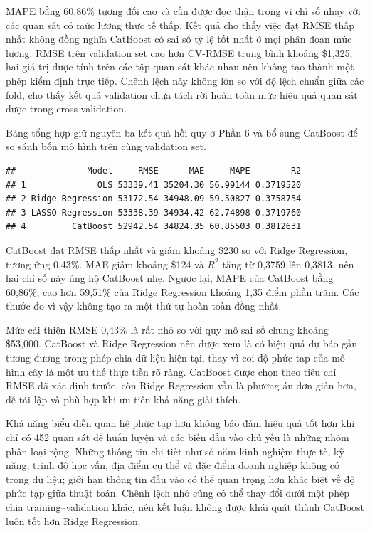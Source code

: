MAPE bằng 60,86\% tương đối cao và cần được đọc thận trọng vì chỉ số
nhạy với các quan sát có mức lương thực tế thấp. Kết quả cho thấy việc
đạt RMSE thấp nhất không đồng nghĩa CatBoost có sai số tỷ lệ tốt nhất ở
mọi phân đoạn mức lương. RMSE trên validation set cao hơn CV-RMSE trung
bình khoảng \$1,325; hai giá trị được tính trên các tập quan sát khác
nhau nên không tạo thành một phép kiểm định trực tiếp. Chênh lệch này
không lớn so với độ lệch chuẩn giữa các fold, cho thấy kết quả
validation chưa tách rời hoàn toàn mức hiệu quả quan sát được trong
cross-validation.

Bảng tổng hợp giữ nguyên ba kết quả hồi quy ở Phần 6 và bổ sung CatBoost
để so sánh bốn mô hình trên cùng validation set.

\begin{verbatim}
##              Model     RMSE      MAE     MAPE        R2
## 1              OLS 53339.41 35204.30 56.99144 0.3719520
## 2 Ridge Regression 53172.54 34948.09 59.50827 0.3758754
## 3 LASSO Regression 53338.39 34934.42 62.74898 0.3719760
## 4         CatBoost 52942.54 34824.35 60.85503 0.3812631
\end{verbatim}

CatBoost đạt RMSE thấp nhất và giảm khoảng \$230 so với Ridge
Regression, tương ứng 0,43\%. MAE giảm khoảng \$124 và \(R^2\) tăng từ 0,3759
lên 0,3813, nên hai chỉ số này ủng hộ CatBoost nhẹ. Ngược lại, MAPE của
CatBoost bằng 60,86\%, cao hơn 59,51\% của Ridge Regression khoảng 1,35
điểm phần trăm. Các thước đo vì vậy không tạo ra một thứ tự hoàn toàn
đồng nhất.

Mức cải thiện RMSE 0,43\% là rất nhỏ so với quy mô sai số chung khoảng
\$53,000. CatBoost và Ridge Regression nên được xem là có hiệu quả dự
báo gần tương đương trong phép chia dữ liệu hiện tại, thay vì coi độ
phức tạp của mô hình cây là một ưu thế thực tiễn rõ ràng. CatBoost được
chọn theo tiêu chí RMSE đã xác định trước, còn Ridge Regression vẫn là
phương án đơn giản hơn, dễ tái lập và phù hợp khi ưu tiên khả năng giải
thích.

Khả năng biểu diễn quan hệ phức tạp hơn không bảo đảm hiệu quả tốt hơn
khi chỉ có 452 quan sát để huấn luyện và các biến đầu vào chủ yếu là
những nhóm phân loại rộng. Những thông tin chi tiết như số năm kinh
nghiệm thực tế, kỹ năng, trình độ học vấn, địa điểm cụ thể và đặc điểm
doanh nghiệp không có trong dữ liệu; giới hạn thông tin đầu vào có thể
quan trọng hơn khác biệt về độ phức tạp giữa thuật toán. Chênh lệch nhỏ
cũng có thể thay đổi dưới một phép chia training--validation khác, nên
kết luận không được khái quát thành CatBoost luôn tốt hơn Ridge
Regression.


